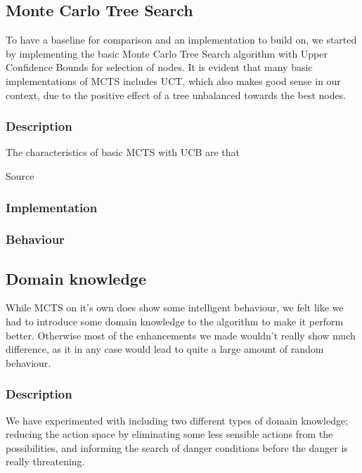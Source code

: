 \documentclass[10pt,a4paper]{article}
\begin{document}
\subsection{Monte Carlo Tree Search}
To have a baseline for comparison and an implementation to build on, we started by implementing the basic Monte Carlo Tree Search algorithm with Upper Confidence Bounds for selection of nodes. It is evident that many basic implementations of MCTS includes UCT\cite{mspacman}, which also makes good sense in our context, due to the positive effect of a tree unbalanced towards the best nodes.

\subsubsection*{Description}
The characteristics of basic MCTS with UCB are that 

Source \cite{mctssurvey}

\subsubsection*{Implementation}


\subsubsection*{Behaviour}

\subsection{Domain knowledge}
While MCTS on it's own does show some intelligent behaviour, we felt like we had to introduce some domain knowledge to the algorithm to make it perform better. Otherwise most of the enhancements we made wouldn't really show much difference, as it in any case would lead to quite a large amount of random behaviour.

\subsubsection*{Description}
We have experimented with including two different types of domain knowledge; reducing the action space by eliminating some less sensible actions from the possibilities, and informing the search of danger conditions before the danger is really threatening.
\end{document}
